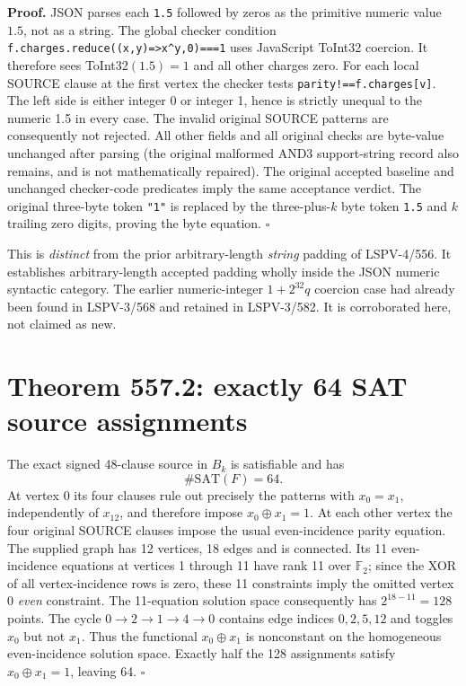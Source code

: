 \documentclass[11pt]{article}
\begin{document}
\noindent\textbf{Proof.}
JSON parses each \texttt{1.5} followed by zeros as the primitive numeric value
$1.5$, not as a string. The global checker condition
\texttt{f.charges.reduce((x,y)=>x\^{}y,0)===1}
uses JavaScript ToInt32 coercion. It therefore sees ToInt32$(1.5)=1$ and all
other charges zero. For each local SOURCE clause at the first vertex the
checker tests \texttt{parity!==f.charges[v]}. The left side is either integer
0 or integer 1, hence is strictly unequal to the numeric 1.5 in every case.
The invalid original SOURCE patterns are consequently not rejected. All other
fields and all original checks are byte-value unchanged after parsing (the
original malformed AND3 support-string record also remains, and is not
mathematically repaired). The original accepted baseline and unchanged
checker-code predicates imply the same acceptance verdict. The original
three-byte token \texttt{"1"} is replaced by the three-plus-$k$ byte token
\texttt{1.5} and $k$ trailing zero digits, proving the byte equation.
\(\square\)

This is \emph{distinct} from the prior arbitrary-length \emph{string} padding
of LSPV-4/556. It establishes arbitrary-length accepted padding wholly inside
the JSON numeric syntactic category. The earlier numeric-integer
$1+2^{32}q$ coercion case had already been found in LSPV-3/568 and
retained in LSPV-3/582. It is corroborated here, not claimed as new.

\section*{Theorem 557.2: exactly 64 SAT source assignments}
The exact signed 48-clause source in $B_k$ is satisfiable and has
\[
 \boxed{\#\mathrm{SAT}(F)=64.}
\]
At vertex 0 its four clauses rule out precisely the patterns with
$x_0=x_1$, independently of $x_{12}$, and therefore impose
$x_0\oplus x_1=1$. At each other vertex the four original SOURCE clauses
impose the usual even-incidence parity equation.
The supplied graph has 12 vertices, 18 edges and is connected.
Its 11 even-incidence equations at vertices 1 through 11 have rank 11
over $\mathbb F_2$; since the XOR of all vertex-incidence rows is zero,
these 11 constraints imply the omitted vertex 0 \emph{even} constraint.
The 11-equation solution space consequently has $2^{18-11}=128$ points.
The cycle $0\to2\to1\to4\to0$ contains edge indices
$0,2,5,12$ and toggles $x_0$ but not $x_1$. Thus the functional
$x_0\oplus x_1$ is nonconstant on the homogeneous even-incidence solution
space. Exactly half the 128 assignments satisfy $x_0\oplus x_1=1$,
leaving 64. \(\square\)
\end{document}
